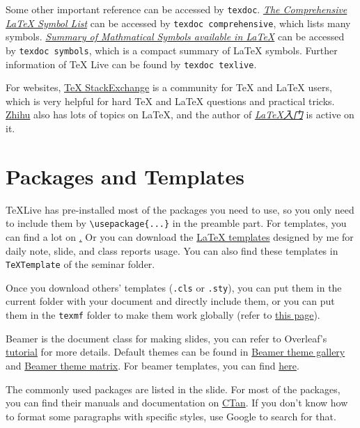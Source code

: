 \documentclass[english]{../TexTemplate/thesis}
\begin{document}
Some other important reference can be accessed by \verb"texdoc". \href{https://www.ctan.org/tex-archive/info/symbols/comprehensive/}{\emph{The Comprehensive \LaTeX{} Symbol List}} can be accessed by \verb"texdoc comprehensive", which lists many symbols. \href{https://www.ctan.org/pkg/maths-symbols}{\emph{Summary of Mathmatical Symbols available in \LaTeX}} can be accessed by \verb"texdoc symbols", which is a compact summary of \LaTeX{} symbols. Further information of \TeX{} Live can be found by \verb"texdoc texlive".

For websites, \href{https://tex.stackexchange.com/}{TeX StackExchange} is a community for \TeX{} and \LaTeX{} users, which is very helpful for hard \TeX{} and \LaTeX{} questions and practical tricks.
\href{https://zhuanlan.zhihu.com/LaTeX}{Zhihu} also has lots of topics on \LaTeX{}, and the author of \href{https://item.jd.com/11258469.html}{\emph{\LaTeX 入门}} is active on it.


\section{Packages and Templates}
TeXLive has pre-installed most of the packages you need to use, so you only need to include them by \verb'\usepackage{...}' in the preamble part.
For templates, you can find a lot on \href{LaTeX studio}. Or you can download the \href{https://github.com/chhzh123/mylatextmpl}{\LaTeX{} templates} designed by me for daily note, slide, and class reports usage.
You can also find these templates in \verb'TeXTemplate' of the seminar folder.

Once you download others' templates (\verb'.cls' or \verb'.sty'), you can put them in the current folder with your document and directly include them, or you can put them in the \verb'texmf' folder to make them work globally (refer to \href{https://marquistj13.github.io/MyBlog/2017/04/install-latex-cls/}{this page}).

Beamer is the document class for making slides, you can refer to Overleaf's \href{https://www.overleaf.com/learn/latex/Beamer_Presentations:_A_Tutorial_for_Beginners_(Part_1)\%E2\%80\%94Getting_Started}{tutorial} for more details.
Default themes can be found in \href{http://deic.uab.es/~iblanes/beamer_gallery/}{Beamer theme gallery} and \href{https://hartwork.org/beamer-theme-matrix/}{Beamer theme matrix}.
For beamer templates, you can find \href{https://www.latexstudio.net/archives/category/tex-slides/beamer-theme-template}{here}.

The commonly used packages are listed in the slide.
For most of the packages, you can find their manuals and documentation on \href{https://ctan.org/}{CTan}.
If you don't know how to format some paragraphs with specific styles, use Google to search for that.
\end{document}
